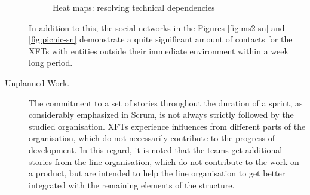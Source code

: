 \begin{description}
\begin{figure}[h!]
      \caption{Heat maps: resolving technical dependencies}
      \label{fig:hm-r}
\end{figure}

In addition to this, the social networks in the Figures \ref{fig:ms2-sn} and \ref{fig:picnic-sn} demonstrate a quite significant amount of contacts for the \acp{XFT} with entities outside their immediate environment within a week long period.

    \item [Unplanned Work.] The commitment to a set of stories throughout the duration of a sprint, as considerably emphasized in Scrum, is not always strictly followed by the studied organisation. \acp{XFT} experience influences from different parts of the organisation, which do not necessarily contribute to the progress of development. In this regard, it is noted that the teams get additional stories from the line organisation, which do not contribute to the work on a product, but are intended to help the line organisation to get better integrated with the remaining elements of the structure.


\end{description}
